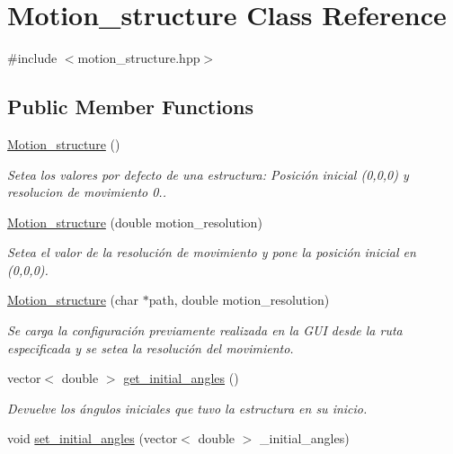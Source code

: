 \hypertarget{class_motion__structure}{\section{Motion\-\_\-structure Class Reference}
\label{class_motion__structure}
}


{\ttfamily \#include $<$motion\-\_\-structure.\-hpp$>$}

\subsection*{Public Member Functions}
\begin{DoxyCompactItemize}
\item 
\hyperlink{class_motion__structure_afee50b3656ee36b005cd5784508e1697}{Motion\-\_\-structure} ()
\begin{DoxyCompactList}\small\item\em Setea los valores por defecto de una estructura\-: Posición inicial (0,0,0) y resolucion de movimiento 0.. \end{DoxyCompactList}\item 
\hyperlink{class_motion__structure_a1c1f2caaf5ad8288ac27b43e1ca9124a}{Motion\-\_\-structure} (double motion\-\_\-resolution)
\begin{DoxyCompactList}\small\item\em Setea el valor de la resolución de movimiento y pone la posición inicial en (0,0,0). \end{DoxyCompactList}\item 
\hyperlink{class_motion__structure_a957707cad2dc4ffbee3e7fe82ef963db}{Motion\-\_\-structure} (char $\ast$path, double motion\-\_\-resolution)
\begin{DoxyCompactList}\small\item\em Se carga la configuración previamente realizada en la G\-U\-I desde la ruta especificada y se setea la resolución del movimiento. \end{DoxyCompactList}\item 
vector$<$ double $>$ \hyperlink{class_motion__structure_a25c277cf49bed7728a894a2df001847b}{get\-\_\-initial\-\_\-angles} ()
\begin{DoxyCompactList}\small\item\em Devuelve los ángulos iniciales que tuvo la estructura en su inicio. \end{DoxyCompactList}\item 
void \hyperlink{class_motion__structure_aa9039180cf7d78c2f126fcdd171398ca}{set\-\_\-initial\-\_\-angles} (vector$<$ double $>$ \-\_\-initial\-\_\-angles)

\end{DoxyCompactItemize}
